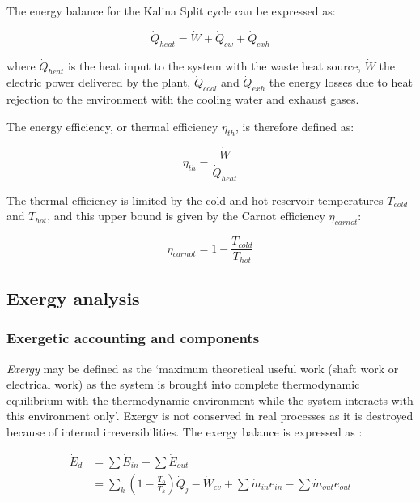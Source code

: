 \documentclass[final,times,3p]{elsarticle}
\begin{document}

	The energy balance for the Kalina Split cycle can be expressed as: 

	\begin{equation}
	 \dot{Q}_{heat}=\dot{W}+\dot{Q}_{cw}+\dot{Q}_{exh}
	\end{equation}	

	where $\dot{Q}_{heat}$ is the heat input to the system with the waste heat source, $\dot{W}$ the electric power delivered by the plant, $\dot{Q}_{cool}$ and $\dot{Q}_{exh}$ the energy losses due to heat rejection to the environment with the cooling water and exhaust gases.
	
	The energy efficiency, or thermal efficiency $\eta_{th}$, is therefore defined as:
	
	\begin{equation}
		\eta_{th} = \frac{\dot{W}}{\dot{Q}_{heat}} 
	\end{equation}	

	The thermal efficiency is limited by the cold and hot reservoir temperatures $T_{cold}$ and $T_{hot}$, and this upper bound is given by the Carnot efficiency $\eta_{carnot}$:
	
	\begin{equation}
		\eta_{carnot} = 1-\frac{T_{cold}}{T_{hot}} 
	\end{equation}
	
	\subsection{Exergy analysis}
	\label{subsec:exergy_analysis}

	\subsubsection{Exergetic accounting and components}
	
	\emph{Exergy} may be defined as the `maximum theoretical useful work (shaft work or electrical work) as the system is brought into complete thermodynamic equilibrium with the thermodynamic environment while the system interacts with this environment only'. Exergy is not conserved in real processes as it is destroyed because of internal irreversibilities. The exergy balance is expressed as \cite{BejanAdrian;TsatsaronisGeorge;Moran1996}: 

	\begin{align}
		\dot{E}_d&=\sum \dot{E}_{in} - \sum \dot{E}_{out} \nonumber\\
					     &=\sum_k \left (1-\frac{T_0}{T_k} \right ) \dot{Q}_j-\dot{W}_{cv}+\sum \dot{m}_{in} e_{in} - \sum \dot{m}_{out} e_{out}
	\end{align}
\end{document}
